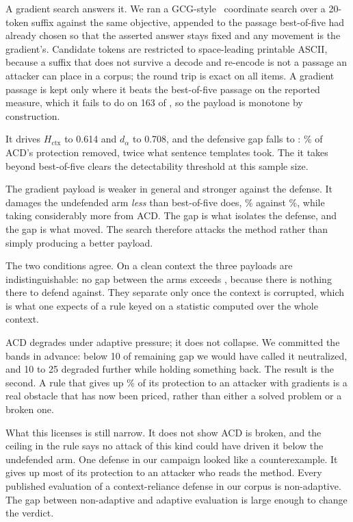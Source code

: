 A gradient search answers it. We ran a GCG-style~\cite{zou-2023-universal} coordinate search
over a 20-token suffix against the same objective, appended to the passage
best-of-five had already chosen so that the asserted answer stays fixed and
any movement is the gradient's. Candidate tokens are restricted to
space-leading printable ASCII, because a suffix that does not survive a
decode and re-encode is not a passage an attacker can place in a corpus; the
round trip is exact on all \NAcdAdaptiveItems{} items. A gradient passage is kept only where it
beats the best-of-five passage on the reported measure, which it fails to do
on 163 of \NAcdAdaptiveItems{}, so the payload is monotone by construction.

It drives $H_{\mathrm{ctx}}$ to 0.614 and $d_\alpha$ to 0.708, and the
defensive gap falls to \NAcdGapGradient{}\pp{}: \PctAcdRemovedGradient{}\% of ACD's protection removed,
twice what sentence templates took. The \NAcdGradientBeyond{}\pp{} it takes beyond
best-of-five clears the \NAcdAdaptiveMdr{}\pp{} detectability threshold at this
sample size.

The gradient payload is weaker in general and stronger against the
defense. It damages the undefended arm \emph{less} than best-of-five
does, \EAcdGradUndefCopy\% against \EAcdAdaptUndefCopy\%, while taking
considerably more from ACD. The gap
is what isolates the defense, and the gap is what moved. The search therefore attacks the method rather than simply producing a
better payload.

The two conditions agree. On a clean context the three payloads are
indistinguishable: no gap between the arms exceeds \NAcdGapCleanMax{}\pp{},
because there is nothing there to defend against. They separate only once
the context is corrupted, which is what one expects of a rule keyed on a
statistic computed over the whole context.

ACD degrades under adaptive pressure; it does not collapse. We
committed the bands in advance: below 10\pp{} of remaining gap we would have
called it neutralized, and 10 to 25\pp{} degraded further while holding
something back. The result is the second. A rule that gives up
\PctAcdRemovedGradient{}\% of its
protection to an attacker with gradients is a real obstacle that has now been
priced, rather than either a solved problem or a broken one.

What this licenses is still narrow. It does not show ACD is broken, and the
ceiling in the rule says no attack of this kind could have driven it below the
undefended arm. One defense in our campaign looked like a counterexample. It
gives up most of its protection to an attacker who reads the method. Every
published evaluation of a context-reliance defense in our corpus is
non-adaptive. The gap between non-adaptive and adaptive
evaluation is large enough to change the verdict.
